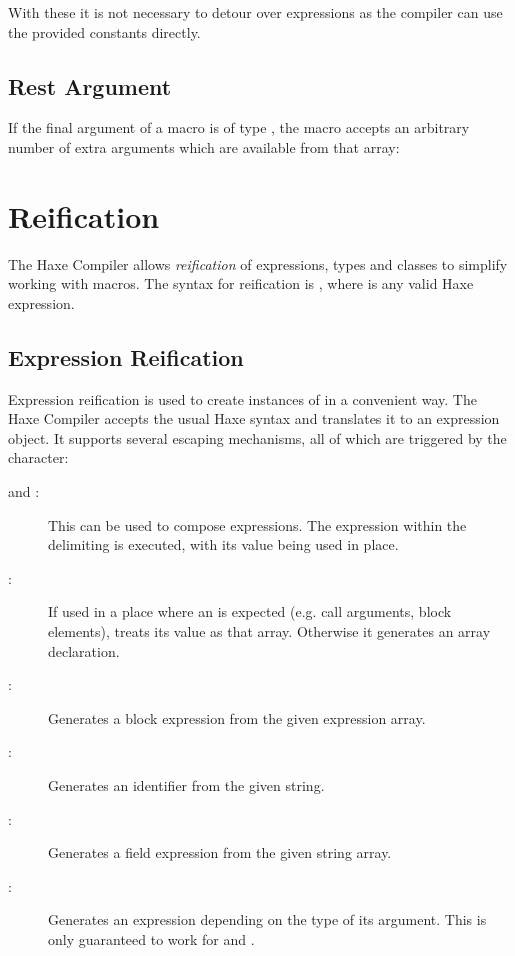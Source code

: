 
With these it is not necessary to detour over expressions as the compiler can use the provided constants directly.

\subsection{Rest Argument}
\label{macro-rest-argument}

If the final argument of a macro is of type , the macro accepts an arbitrary number of extra arguments which are available from that array:





\section{Reification}
\label{macro-reification}

The Haxe Compiler allows \emph{reification} of expressions, types and classes to simplify working with macros. The syntax for reification is , where  is any valid Haxe expression.

\subsection{Expression Reification}
\label{macro-reification-expression}

Expression reification is used to create instances of  in a convenient way. The Haxe Compiler accepts the usual Haxe syntax and translates it to an expression object. It supports several escaping mechanisms, all of which are triggered by the \expr{\$} character:

\begin{description}
	\item[\expr{\$\{\}} and :]  This can be used to compose expressions. The expression within the delimiting \expr{\{ \}} is executed, with its value being used in place.
	\item[:]  If used in a place where an  is expected (e.g. call arguments, block elements),  treats its value as that array. Otherwise it generates an array declaration.
	\item[:]  Generates a block expression from the given expression array.
	\item[:]  Generates an identifier from the given string.
	\item[:]  Generates a field expression from the given string array.
	\item[:]  Generates an expression depending on the type of its argument. This is only guaranteed to work for  and .
\end{description}

